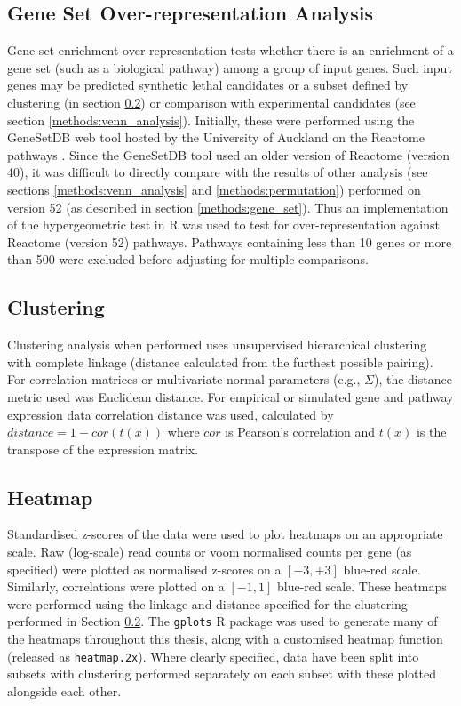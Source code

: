 \subsection{Gene Set Over-representation Analysis}
Gene set enrichment over-representation tests whether there is an enrichment of a gene set (such as a biological pathway) among a group of input genes. Such input genes may be predicted synthetic lethal candidates or a subset defined by clustering (in section \ref{methods:clustering}) or comparison with experimental candidates (see section \ref{methods:venn_analysis}). Initially, these were performed using the GeneSetDB web tool \citep{genesetdb} hosted by the University of Auckland on the Reactome pathways \citep{Reactome}. Since the GeneSetDB tool used an older version of Reactome (version 40), it was difficult to directly compare with the results of other analysis (see sections \ref{methods:venn_analysis} and \ref{methods:permutation}) performed on version 52 (as described in  section \ref{methods:gene_set}). Thus an implementation of the hypergeometric test in R \citep{R_core} was used to test for over-representation against Reactome (version 52) pathways. Pathways containing less than 10 genes or more than 500 \citep[as performed in GeneSetDB by][]{genesetdb} were excluded before adjusting for multiple comparisons.

\subsection{Clustering} \label{methods:clustering}
Clustering analysis when performed uses unsupervised hierarchical clustering with complete linkage (distance calculated from the furthest possible pairing). For correlation matrices or multivariate normal parameters (e.g., $\Sigma$), the distance metric used was Euclidean distance. For empirical or simulated gene and pathway expression data correlation distance was used, calculated by $distance = 1 - cor(t(x))$ where $cor$ is Pearson's correlation and $t(x)$ is the transpose of the expression matrix. 

\subsection{Heatmap} \label{methods:heatmap}
Standardised z-scores of the data were used to plot heatmaps on an appropriate scale. Raw (log-scale) read counts or voom normalised counts per gene (as specified) were plotted  as normalised z-scores on a $[-3,+3]$ blue-red scale. Similarly, correlations were plotted on a $[-1,1]$ blue-red scale. These heatmaps were performed using the linkage and distance specified for the clustering performed in Section \ref{methods:clustering}. The \texttt{gplots} R package \citep{gplots} was used to generate many of the heatmaps throughout this thesis, along with a customised heatmap function (released as \texttt{heatmap.2x}). Where clearly specified, data have been split into subsets with clustering performed separately on each subset with these plotted alongside each other.

